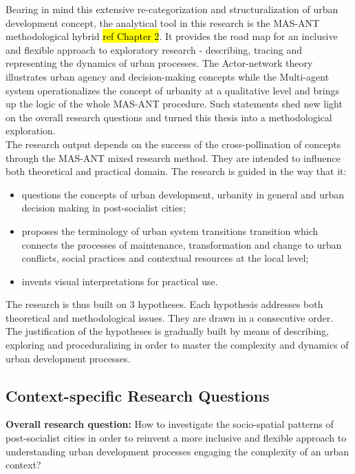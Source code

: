 \documentclass[11pt]{report}
\begin{document}
Bearing in mind this extensive re-categorization and structuralization of urban development concept, the analytical tool in this research is the MAS-ANT methodological hybrid \hl{ref Chapter 2}. 
It provides the road map for an inclusive and flexible approach to exploratory research - describing, tracing and representing the dynamics of urban processes.
The Actor-network theory illustrates urban agency and decision-making concepts while the Multi-agent system operationalizes the concept of urbanity at a qualitative level and brings up the logic of the whole MAS-ANT procedure. Such statements shed new light on the overall research questions and turned this thesis into a methodological exploration.
\\
The research output depends on the success of the cross-pollination of concepts through the MAS-ANT mixed research method. They are intended to influence both theoretical and practical domain. The research is guided in the way that it:
\begin{itemize}
\item questions the concepts of urban development, urbanity in general and urban decision making in post-socialist cities;
\item proposes the terminology of urban system transitions transition which connects the processes of maintenance, transformation and change to urban conflicts, social practices and contextual resources at the local level;
\item invents visual interpretations for practical use.
\end{itemize}

The research is thus built on 3 hypotheses. Each hypothesis addresses both theoretical and methodological issues. They are drawn in a consecutive order. The justification of the hypotheses is gradually built by means of describing, exploring and proceduralizing in order to master the complexity and dynamics of urban development processes. 

\subsection{Context-specific Research Questions}

\textbf{Overall research question:} How to investigate the socio-spatial patterns of post-socialist cities in order to reinvent a more inclusive and flexible approach to understanding urban development processes engaging the complexity of an urban context? 
\end{document}
